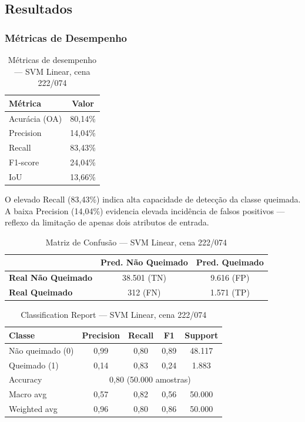 \documentclass[conference]{IEEEtran}
\begin{document}
\subsection{Resultados}

\subsubsection{Métricas de Desempenho}

\begin{table}[!t]
  \caption{Métricas de desempenho — SVM Linear, cena 222/074}
  \label{tab:svm_linear_metrics}
  \centering
  \begin{tabular}{lc}
    \toprule
    \textbf{Métrica} & \textbf{Valor} \\
    \midrule
    Acurácia (OA)    & 80,14\% \\
    Precision        & 14,04\% \\
    Recall           & 83,43\% \\
    F1-score         & 24,04\% \\
    IoU              & 13,66\% \\
    \bottomrule
  \end{tabular}
\end{table}

O elevado Recall (83,43\%) indica alta capacidade de detecção da classe
queimada. A baixa Precision (14,04\%) evidencia elevada incidência de
falsos positivos — reflexo da limitação de apenas dois atributos de
entrada.

\begin{table}[!t]
  \caption{Matriz de Confusão — SVM Linear, cena 222/074}
  \label{tab:svm_linear_cm}
  \centering
  \begin{tabular}{lcc}
    \toprule
    & \textbf{Pred. Não Queimado} & \textbf{Pred. Queimado} \\
    \midrule
    \textbf{Real Não Queimado} & 38.501 (TN) & 9.616 (FP) \\
    \textbf{Real Queimado}     &    312 (FN) & 1.571 (TP) \\
    \bottomrule
  \end{tabular}
\end{table}

\begin{table}[!t]
  \caption{Classification Report — SVM Linear, cena 222/074}
  \label{tab:svm_linear_report}
  \centering
  \begin{tabular}{lcccc}
    \toprule
    \textbf{Classe} & \textbf{Precision} & \textbf{Recall}
                    & \textbf{F1} & \textbf{Support} \\
    \midrule
    Não queimado (0) & 0,99 & 0,80 & 0,89 & 48.117 \\
    Queimado (1)     & 0,14 & 0,83 & 0,24 & 1.883  \\
    \midrule
    Accuracy         & \multicolumn{4}{c}{0,80 (50.000 amostras)} \\
    Macro avg        & 0,57 & 0,82 & 0,56 & 50.000 \\
    Weighted avg     & 0,96 & 0,80 & 0,86 & 50.000 \\
    \bottomrule
  \end{tabular}
\end{table}
\end{document}
